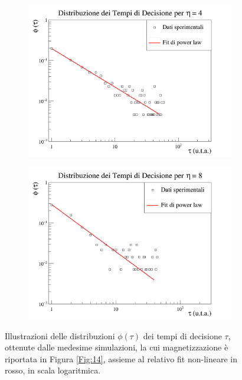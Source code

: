 \documentclass[letterpaper,10pt]{article}
\begin{document}
\begin{figure}
\ContinuedFloat
\centering
\begin{subfigure}{0.8\textwidth}
\includegraphics[width=\linewidth]{Immagini/partial_time_graph_v4.png}
\end{subfigure}
\begin{subfigure}{0.8\textwidth}
\includegraphics[width=\linewidth]{Immagini/partial_time_graph_v8.png}
\end{subfigure}
\caption{Illustrazioni delle distribuzioni $\phi(\tau)$ dei tempi di decisione $\tau$, ottenute dalle medesime simulazioni, la cui magnetizzazione è riportata in Figura \ref{Fig:14}, assieme al relativo fit non-lineare in rosso, in scala logaritmica.}
\label{Fig:15}
\end{figure}
\end{document}
